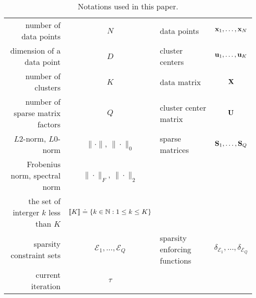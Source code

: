 



\begin{table}[t]
	\centering
	\begin{tabular}{|r|c||l|c|}
		\hline
		number of data points & $N$ & data points  & ${\mathbf{x}}_1,\ldots, {\mathbf{x}}_N $  \\
		dimension of a data point & $D$ &  cluster centers   & ${\mathbf{u}}_1,\ldots, {\mathbf{u}}_K $  \\
		number of clusters & $K$ &  data matrix  & $ {\mathbf{X}}$  \\
		number of sparse matrix factors& $Q$ & cluster center matrix & ${\mathbf{U}}$ \\
		$L2$-norm, $L0$-norm& $\|\cdot\|$, $\|\cdot\|_0$ & sparse matrices & ${\mathbf{S}}_1, \ldots, {\mathbf{S}}_Q$ \\
		Frobenius norm, 	spectral norm & $\|\cdot\|_F$, $\|\cdot\|_2$ & & \\
		 the set of interger $k$ less than $K$& $\left \llbracket K\right \rrbracket\doteq \left \lbrace k\in {\mathbb{N}}: 1 \leq k \leq K\right \rbrace$  & & \\
		 sparsity constraint sets & $\mathcal{E}_1, \ldots, \mathcal{E}_Q$  & sparsity enforcing functions & $\delta_{\mathcal{E}_1},\ldots,\delta_{\mathcal{E}_Q}$  \\
		  current iteration & $\tau$  & &  \\
		\hline
	\end{tabular}
	\caption{Notations used in this paper.}
	\label{tab:notation}
\end{table}
\addtocounter{footnote}{0}




